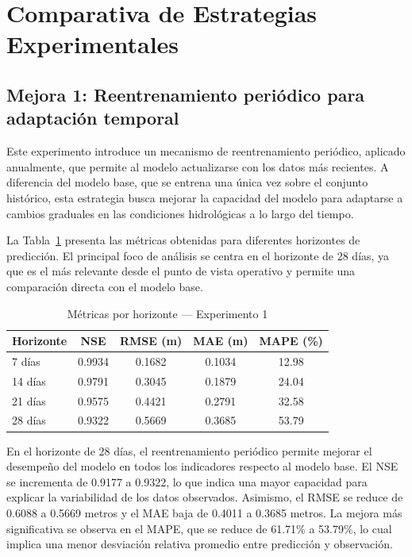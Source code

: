 \section{Comparativa de Estrategias Experimentales}
\label{sec:comparativa_experimentos}

\subsection{Mejora 1: Reentrenamiento periódico para adaptación temporal}
\label{ssec:exp1}

Este experimento introduce un mecanismo de reentrenamiento periódico, aplicado anualmente, que permite al modelo actualizarse con los datos más recientes. A diferencia del modelo base, que se entrena una única vez sobre el conjunto histórico, esta estrategia busca mejorar la capacidad del modelo para adaptarse a cambios graduales en las condiciones hidrológicas a lo largo del tiempo.

La Tabla~\ref{tab:exp1_metricas_horizontes} presenta las métricas obtenidas para diferentes horizontes de predicción. El principal foco de análisis se centra en el horizonte de 28 días, ya que es el más relevante desde el punto de vista operativo y permite una comparación directa con el modelo base.

\begin{table}[H]
\centering
\caption{Métricas por horizonte — Experimento 1}
\label{tab:exp1_metricas_horizontes}
\begin{tabular}{lcccc}
\toprule
\textbf{Horizonte} & \textbf{NSE} & \textbf{RMSE (m)} & \textbf{MAE (m)} & \textbf{MAPE (\%)} \\
\midrule
7 días  & 0.9934 & 0.1682 & 0.1034 & 12.98 \\
14 días & 0.9791 & 0.3045 & 0.1879 & 24.04 \\
21 días & 0.9575 & 0.4421 & 0.2791 & 32.58 \\
28 días & 0.9322 & 0.5669 & 0.3685 & 53.79 \\
\bottomrule
\end{tabular}
\end{table}


En el horizonte de 28 días, el reentrenamiento periódico permite mejorar el desempeño del modelo en todos los indicadores respecto al modelo base. El NSE se incrementa de 0.9177 a 0.9322, lo que indica una mayor capacidad para explicar la variabilidad de los datos observados. Asimismo, el RMSE se reduce de 0.6088 a 0.5669 metros y el MAE baja de 0.4011 a 0.3685 metros. La mejora más significativa se observa en el MAPE, que se reduce de 61.71\% a 53.79\%, lo cual implica una menor desviación relativa promedio entre predicción y observación.

